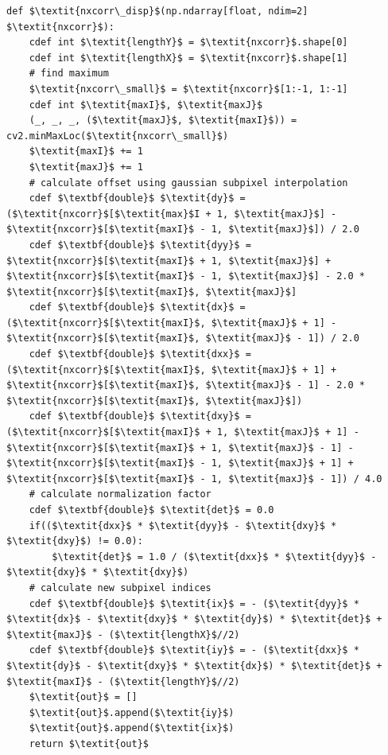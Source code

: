 \begin{lstlisting}[caption={Die in Cython optimierte Funktion nxcorr\_disp()}, label={lst:cython_nxd}]
def $\textit{nxcorr\_disp}$(np.ndarray[float, ndim=2] $\textit{nxcorr}$):
	cdef int $\textit{lengthY}$ = $\textit{nxcorr}$.shape[0]
	cdef int $\textit{lengthX}$ = $\textit{nxcorr}$.shape[1]
	# find maximum
	$\textit{nxcorr\_small}$ = $\textit{nxcorr}$[1:-1, 1:-1]
	cdef int $\textit{maxI}$, $\textit{maxJ}$
	(_, _, _, ($\textit{maxJ}$, $\textit{maxI}$)) = cv2.minMaxLoc($\textit{nxcorr\_small}$)
	$\textit{maxI}$ += 1
	$\textit{maxJ}$ += 1
	# calculate offset using gaussian subpixel interpolation
	cdef $\textbf{double}$ $\textit{dy}$ = ($\textit{nxcorr}$[$\textit{max}$I + 1, $\textit{maxJ}$] - $\textit{nxcorr}$[$\textit{maxI}$ - 1, $\textit{maxJ}$]) / 2.0
	cdef $\textbf{double}$ $\textit{dyy}$ = $\textit{nxcorr}$[$\textit{maxI}$ + 1, $\textit{maxJ}$] + $\textit{nxcorr}$[$\textit{maxI}$ - 1, $\textit{maxJ}$] - 2.0 * $\textit{nxcorr}$[$\textit{maxI}$, $\textit{maxJ}$]
	cdef $\textbf{double}$ $\textit{dx}$ = ($\textit{nxcorr}$[$\textit{maxI}$, $\textit{maxJ}$ + 1] - $\textit{nxcorr}$[$\textit{maxI}$, $\textit{maxJ}$ - 1]) / 2.0
	cdef $\textbf{double}$ $\textit{dxx}$ = ($\textit{nxcorr}$[$\textit{maxI}$, $\textit{maxJ}$ + 1] + $\textit{nxcorr}$[$\textit{maxI}$, $\textit{maxJ}$ - 1] - 2.0 * $\textit{nxcorr}$[$\textit{maxI}$, $\textit{maxJ}$])
	cdef $\textbf{double}$ $\textit{dxy}$ = ($\textit{nxcorr}$[$\textit{maxI}$ + 1, $\textit{maxJ}$ + 1] - $\textit{nxcorr}$[$\textit{maxI}$ + 1, $\textit{maxJ}$ - 1] - $\textit{nxcorr}$[$\textit{maxI}$ - 1, $\textit{maxJ}$ + 1] + $\textit{nxcorr}$[$\textit{maxI}$ - 1, $\textit{maxJ}$ - 1]) / 4.0
	# calculate normalization factor
	cdef $\textbf{double}$ $\textit{det}$ = 0.0
	if(($\textit{dxx}$ * $\textit{dyy}$ - $\textit{dxy}$ * $\textit{dxy}$) != 0.0):
		$\textit{det}$ = 1.0 / ($\textit{dxx}$ * $\textit{dyy}$ - $\textit{dxy}$ * $\textit{dxy}$)
	# calculate new subpixel indices
	cdef $\textbf{double}$ $\textit{ix}$ = - ($\textit{dyy}$ * $\textit{dx}$ - $\textit{dxy}$ * $\textit{dy}$) * $\textit{det}$ + $\textit{maxJ}$ - ($\textit{lengthX}$//2)
	cdef $\textbf{double}$ $\textit{iy}$ = - ($\textit{dxx}$ * $\textit{dy}$ - $\textit{dxy}$ * $\textit{dx}$) * $\textit{det}$ + $\textit{maxI}$ - ($\textit{lengthY}$//2)
	$\textit{out}$ = []
	$\textit{out}$.append($\textit{iy}$)
	$\textit{out}$.append($\textit{ix}$)
	return $\textit{out}$
\end{lstlisting}